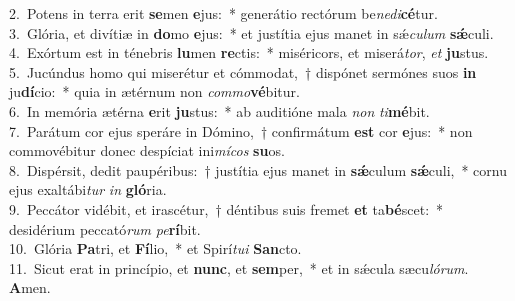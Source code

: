 {2.~}Potens in terra erit \textbf{se}men \textbf{e}jus:~* generátio rectórum be\textit{ne}\textit{di}\textbf{cé}tur.\\
{3.~}Glória, et divítiæ in \textbf{do}mo \textbf{e}jus:~* et justítia ejus manet in sǽ\textit{cu}\textit{lum} \textbf{sǽ}culi.\\
{4.~}Exórtum est in ténebris \textbf{lu}men \textbf{re}ctis:~* miséricors, et miserá\textit{tor}, \textit{et} \textbf{ju}stus.\\
{5.~}Jucúndus homo qui miserétur et cómmodat,~† dispónet sermónes suos \textbf{in} ju\textbf{dí}cio:~* quia in ætérnum non \textit{com}\textit{mo}\textbf{vé}bitur.\\
{6.~}In memória ætérna \textbf{e}rit \textbf{ju}stus:~* ab auditióne mala \textit{non} \textit{ti}\textbf{mé}bit.\\
{7.~}Parátum cor ejus speráre in Dómino,~† confirmátum \textbf{est} cor \textbf{e}jus:~* non commovébitur donec despíciat ini\textit{mí}\textit{cos} \textbf{su}os.\\
{8.~}Dispérsit, dedit paupéribus:~† justítia ejus manet in \textbf{sǽ}culum \textbf{sǽ}culi,~* cornu ejus exaltábi\textit{tur} \textit{in} \textbf{gló}ria.\\
{9.~}Peccátor vidébit, et irascétur,~† déntibus suis fremet \textbf{et} ta\textbf{bé}scet:~* desidérium peccató\textit{rum} \textit{pe}\textbf{rí}bit.\\
{10.~}Glória \textbf{Pa}tri, et \textbf{Fí}lio,~* et Spirí\textit{tu}\textit{i} \textbf{San}cto.\\
{11.~}Sicut erat in princípio, et \textbf{nunc}, et \textbf{sem}per,~* et in sǽcula sæcu\textit{ló}\textit{rum}. \textbf{A}men.\\
